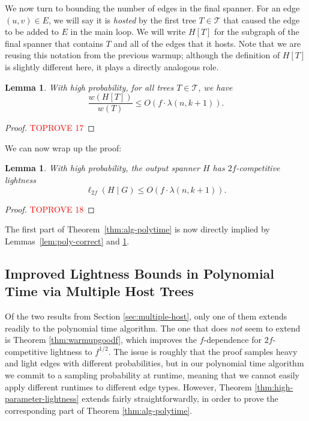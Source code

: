 \documentclass{article}
\theoremstyle{plain}
\newtheorem{lemma}[theorem]{Lemma}
\theoremstyle{definition}
\newcommand{\tee}{\mathcal{T}}
\begin{document}
We now turn to bounding the number of edges in the final spanner.
For an edge $(u, v) \in E$, we will say it is \emph{hosted} by the first tree $T \in \tee$ that caused the edge to be added to $E$ in the main loop.
We will write $H[T]$ for the subgraph of the final spanner that contains $T$ and all of the edges that it hosts.
Note that we are reusing this notation from the previous warmup; although the definition of $H[T]$ is slightly different here, it plays a directly analogous role.

\begin{lemma} \label{lem:polyhostbound}
With high probability, for all trees $T \in \mathcal{T}$, we have
$$\frac{w(H[T])}{w(T)} \le O\left(f \cdot \lambda(n, k+1)\right).$$
\end{lemma}
\begin{proof}\textcolor{red}{TOPROVE 17}\end{proof}

We can now wrap up the proof:
\begin{lemma} \label{lem:poly-light}
With high probability, the output spanner $H$ has $2f$-competitive lightness
$$\ell_{2f}(H \mid G) \le O\left( f \cdot \lambda(n, k+1) \right).$$
\end{lemma}
\begin{proof}\textcolor{red}{TOPROVE 18}\end{proof}

The first part of Theorem~\ref{thm:alg-polytime} is now directly implied by Lemmas~\ref{lem:poly-correct} and \ref{lem:poly-light}.

\subsection{Improved Lightness Bounds in Polynomial Time via Multiple Host Trees}

Of the two results from Section \ref{sec:multiple-host}, only one of them extends readily to the polynomial time algorithm.
The one that does \emph{not} seem to extend is Theorem \ref{thm:warmupgoodf}, which improves the $f$-dependence for $2f$-competitive lightness to $f^{1/2}$.
The issue is roughly that the proof samples heavy and light edges with different probabilities, but in our polynomial time algorithm we commit to a sampling probability at runtime, meaning that we cannot easily apply different runtimes to different edge types.
However, Theorem \ref{thm:high-parameter-lightness} extends fairly straightforwardly, in order to prove the corresponding part of Theorem \ref{thm:alg-polytime}.
\end{document}
